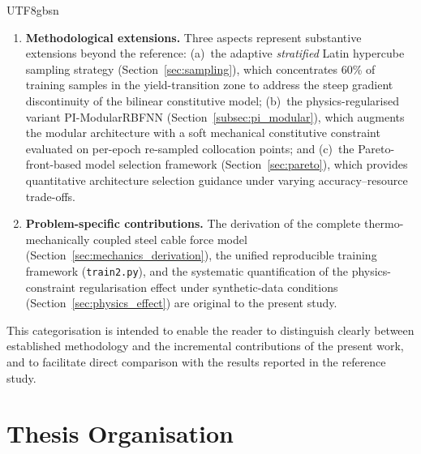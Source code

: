 \documentclass[a4paper,12pt]{report}
\begin{document}
\begin{CJK}{UTF8}{gbsn}
\begin{enumerate}[label=(\roman*)]
  \item \textbf{Methodological extensions.}
    Three aspects represent substantive extensions beyond the reference:
    (a)~the adaptive \emph{stratified} Latin hypercube sampling strategy
    (Section~\ref{sec:sampling}), which concentrates 60\% of training samples
    in the yield-transition zone to address the steep gradient discontinuity of the
    bilinear constitutive model;
    (b)~the physics-regularised variant PI-ModularRBFNN
    (Section~\ref{subsec:pi_modular}), which augments the modular architecture with
    a soft mechanical constitutive constraint evaluated on per-epoch re-sampled
    collocation points; and
    (c)~the Pareto-front-based model selection framework
    (Section~\ref{sec:pareto}), which provides quantitative architecture selection
    guidance under varying accuracy--resource trade-offs.

  \item \textbf{Problem-specific contributions.}
    The derivation of the complete thermo-mechanically coupled steel cable force model
    (Section~\ref{sec:mechanics_derivation}), the unified reproducible training framework
    (\texttt{train2.py}), and the systematic quantification of the physics-constraint
    regularisation effect under synthetic-data conditions
    (Section~\ref{sec:physics_effect}) are original to the present study.
\end{enumerate}

This categorisation is intended to enable the reader to distinguish clearly between
established methodology and the incremental contributions of the present work, and to
facilitate direct comparison with the results reported in the reference study.

\section{Thesis Organisation}
\label{sec:intro_organisation}


\end{CJK}
\end{document}
